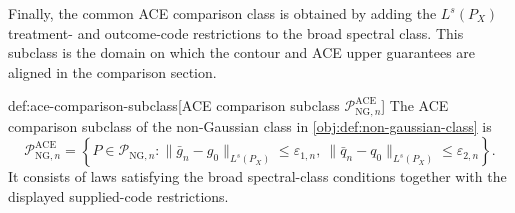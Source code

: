 Finally, the common ACE comparison class is obtained by adding the \(L^s(P_X)\) treatment- and outcome-code restrictions to the broad spectral class. This subclass is the domain on which the contour and ACE upper guarantees are aligned in the comparison section.

\begin{definitionv}{def:ace-comparison-subclass}[ACE comparison subclass \(\mathcal P_{\mathrm{NG},n}^{\mathrm{ACE}}\)]
The ACE comparison subclass of the non-Gaussian class in \cref{obj:def:non-gaussian-class} is
\[
\mathcal P_{\mathrm{NG},n}^{\mathrm{ACE}}
=
\left\{
P\in\mathcal P_{\mathrm{NG},n}:
\|\bar g_n-g_0\|_{L^s(P_X)}\le\varepsilon_{1,n},
\ 
\|\bar q_n-q_0\|_{L^s(P_X)}\le\varepsilon_{2,n}
\right\}.
\]
It consists of laws satisfying the broad spectral-class conditions together with the displayed supplied-code restrictions.
\end{definitionv}
